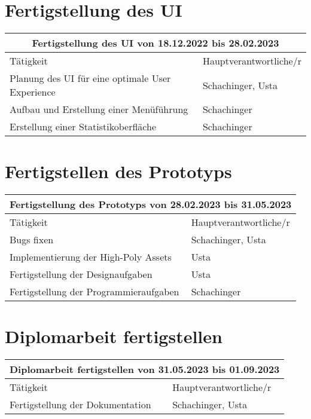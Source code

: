 \section{Fertigstellung des UI}
\begin{tabular}{|m{}|m{}|}
\hline
\multicolumn{2}{|c|}{\textbf{Fertigstellung des UI von 18.12.2022 bis 28.02.2023}} \\
\hline
Tätigkeit & Hauptverantwortliche/r \\
\hline
Planung des UI für eine optimale User Experience & Schachinger, Usta \\
\hline
Aufbau und Erstellung einer Menüführung & Schachinger \\
\hline
Erstellung einer Statistikoberfläche & Schachinger \\
\hline
\end{tabular}

\section{Fertigstellen des Prototyps}
\begin{tabular}{|m{}|m{}|}
\hline
\multicolumn{2}{|c|}{\textbf{Fertigstellung des Prototyps von 28.02.2023 bis 31.05.2023}} \\
\hline
Tätigkeit & Hauptverantwortliche/r \\
\hline
Bugs fixen & Schachinger, Usta \\
\hline
Implementierung der High-Poly Assets & Usta \\
\hline
Fertigstellung der Designaufgaben & Usta \\
\hline
Fertigstellung der Programmieraufgaben & Schachinger \\
\hline
\end{tabular}

\section{Diplomarbeit fertigstellen}
\begin{tabular}{|m{}|m{}|}
\hline
\multicolumn{2}{|c|}{\textbf{Diplomarbeit fertigstellen von 31.05.2023 bis 01.09.2023}} \\
\hline
Tätigkeit & Hauptverantwortliche/r \\
\hline
Fertigstellung der Dokumentation & Schachinger, Usta\\
\hline
\end{tabular}

